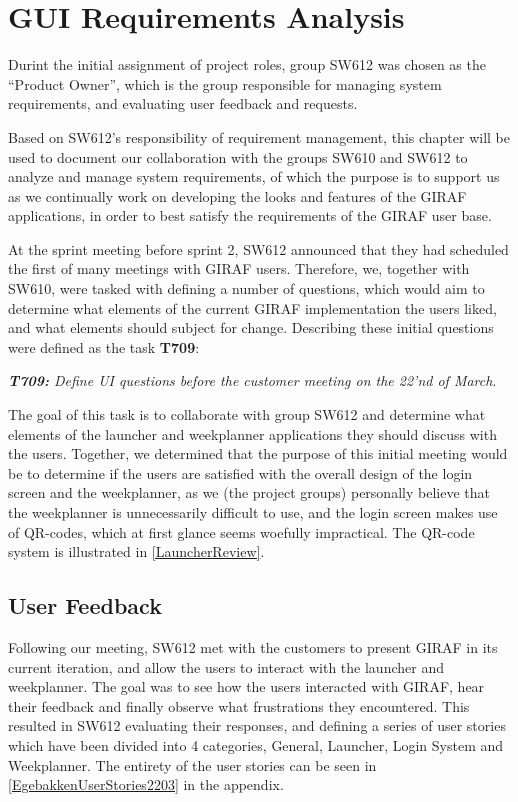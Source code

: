 \chapter{GUI Requirements Analysis}\label{sec:Colab2}
Durint the initial assignment of project roles, group SW612 was chosen as the
``Product Owner'', which is the group responsible for managing system
requirements, and evaluating user feedback and requests.\nl

Based on SW612's responsibility of requirement management, this chapter will be
used to document our collaboration with the groups SW610 and SW612 to analyze
and manage system requirements, of which the purpose is to support us as we
continually work on developing the looks and features of the GIRAF applications,
in order to best satisfy the requirements of the GIRAF user base.\nl

At the sprint meeting before sprint 2, SW612 announced that they had scheduled
the first of many meetings with GIRAF users. Therefore, we, together with SW610,
were tasked with defining a number of questions, which would aim to determine
what elements of the current GIRAF implementation the users liked, and what
elements should subject for change. Describing these initial questions were 
defined as the task \textbf{T709}:\nl

\textit{\textbf{T709:} Define UI questions before the customer meeting on the
22'nd of March}.\nl 

The goal of this task is to collaborate with group SW612 and determine what
elements of the launcher and weekplanner applications they should discuss with
the users. Together, we determined that the purpose of this initial meeting
would be to determine if the users are satisfied with the overall design of the
login screen and the weekplanner, as we (the project groups) personally believe
that the weekplanner is unnecessarily difficult to use, and the login screen
makes use of QR-codes, which at first glance seems woefully impractical. The
QR-code system is illustrated in
\autoref{LauncherReview}.\nl

\section{User Feedback}
Following our meeting, SW612 met with the customers to present GIRAF in its
current iteration, and allow the users to interact with the launcher and
weekplanner.
The goal was to see how the users interacted with GIRAF, hear their feedback and
finally observe what frustrations they encountered. This resulted in SW612
evaluating their responses, and defining a series of user stories which have
been divided into 4 categories, General, Launcher, Login System and Weekplanner.
The entirety of the user stories can be seen in
\autoref{EgebakkenUserStories2203} in the appendix.\nl

